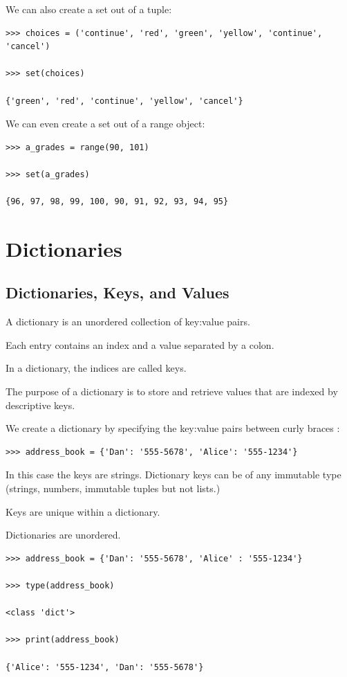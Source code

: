 \documentclass{article}
\begin{document}
We can also create a set out of a tuple:

\begin{lstlisting}
>>> choices = ('continue', 'red', 'green', 'yellow', 'continue', 'cancel')

>>> set(choices)

{'green', 'red', 'continue', 'yellow', 'cancel'}
\end{lstlisting}

We can even create a set out of a range object:

\begin{lstlisting}
>>> a_grades = range(90, 101)

>>> set(a_grades)

{96, 97, 98, 99, 100, 90, 91, 92, 93, 94, 95}
\end{lstlisting}

\section{Dictionaries}

\subsection{Dictionaries, Keys, and Values}

A dictionary is an unordered collection of key:value pairs.  

Each entry contains an index and a value separated by a colon. 

In a dictionary, the indices are called keys.

The purpose of a dictionary is to store and retrieve values that are indexed by descriptive keys.

We create a dictionary by specifying the key:value pairs between curly braces {}:

\begin{lstlisting}
>>> address_book = {'Dan': '555-5678', 'Alice': '555-1234'}
\end{lstlisting}

In this case the keys are strings.  Dictionary keys can be of any immutable type (strings, numbers, immutable tuples but not lists.) 

Keys are unique within a dictionary.

Dictionaries are unordered.

\begin{lstlisting}
>>> address_book = {'Dan': '555-5678', 'Alice' : '555-1234'}

>>> type(address_book)

<class 'dict'>

>>> print(address_book)

{'Alice': '555-1234', 'Dan': '555-5678'} 
\end{lstlisting}
\end{document}
